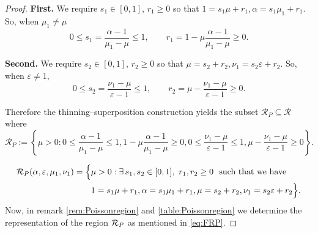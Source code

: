 \begin{proof}
\noindent\textbf{First.}
We require \(s_1\in[0,1]\), \(r_1\ge0\) so that $1=s_1\mu+r_1,
\alpha=s_1\mu_1+r_1.$ So, when $\mu_1 \neq \mu$
\begin{equation}
0\leq s_1=\frac{\alpha-1}{\mu_1-\mu} \leq 1,
\qquad
r_1=1-\mu\frac{\alpha-1}{\mu_1-\mu} \geq 0.
\end{equation}

\textbf{Second.} We require \(s_2\in[0,1]\), \(r_2\ge0\) so that $\mu=s_2+r_2,
\nu_1=s_2\varepsilon+r_2.$ So, when \(\varepsilon\neq1\),
\begin{equation}
0\leq s_2=\frac{\nu_1-\mu}{\varepsilon-1} \leq 1,
\qquad
r_2=\mu-\frac{\nu_1-\mu}{\varepsilon-1} \geq 0.
\end{equation}
\medskip

Therefore the thinning--superposition construction yields the subset $\mathcal R_{P} \subseteq \mathcal R $ where
\[
\mathcal R_{P}
:=
\left\{
\mu>0:
0\le \frac{\alpha-1}{\mu_1-\mu}\le1,
1-\mu\frac{\alpha-1}{\mu_1-\mu}\ge0,
0\le \frac{\nu_1-\mu}{\varepsilon-1}\le1,
\mu-\frac{\nu_1-\mu}{\varepsilon-1}\ge0
\right\}.
\]

\begin{align} \label{eq:R_P}
\mathcal R_{P}(\alpha, \varepsilon, \mu_1, \nu_1)
&=
\Bigl\{
\mu>0:
\exists\, s_1,s_2\in[0,1],\ r_1,r_2\ge0 \ \text{ such that we have } \\
&\qquad
1 = s_1\mu + r_1,
\alpha = s_1\mu_1 + r_1, 
\mu = s_2 + r_2,
\nu_1 = s_2\varepsilon + r_2
\Bigr\}.
\end{align}
Now, in remark \ref{rem:Poissonregion} and \ref{table:Poissonregion} we determine the representation of the region $\mathcal{R}_{P}$ as mentioned in \ref{eq:FRP}.


\end{proof}
